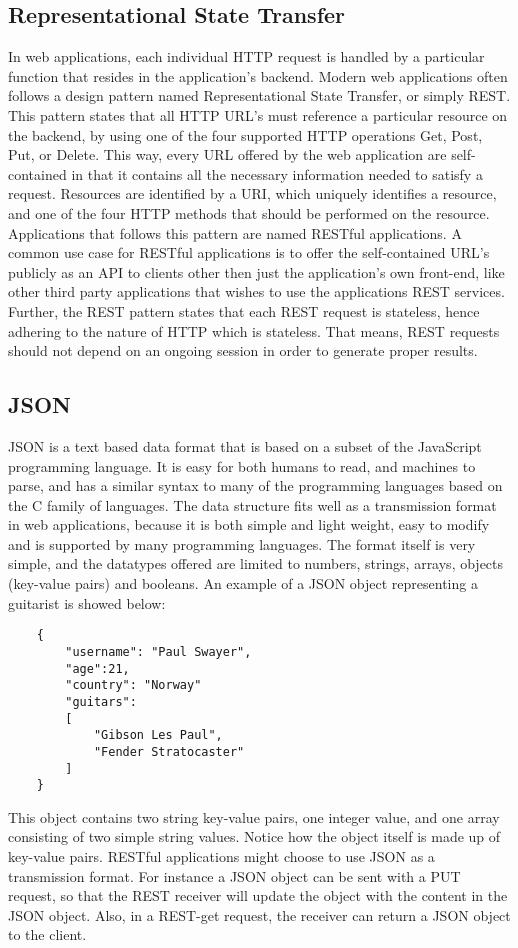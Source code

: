 \subsection{Representational State Transfer}
In web applications, each individual HTTP request is handled by a particular function that resides in the application's backend. Modern web applications often follows a design pattern named Representational State Transfer, or simply REST. \cite{armando2012} This pattern states that all HTTP URL's must reference a particular resource on the backend, by using one of the four supported HTTP operations Get, Post, Put, or Delete. This way, every URL offered by the web application are self-contained in that it contains all the necessary information needed to satisfy a request. Resources are identified by a URI, which uniquely identifies a resource, and one of the four HTTP methods that should be performed on the resource. Applications that follows this pattern are named RESTful applications. A common use case for RESTful applications is to offer the self-contained URL's publicly as an API to clients other then just the application's own front-end, like other third party applications that wishes to use the applications REST services. Further, the REST pattern states that each REST request is stateless, hence adhering to the nature of HTTP which is stateless. That means, REST requests should not depend on an ongoing session in order to generate proper results.

\subsection{JSON}
JSON\cite{json} is a text based data format that is based on a subset of the JavaScript programming language. It is easy for both humans to read, and machines to parse, and has a similar syntax to many of the programming languages based on the C family of languages. The data structure fits well as a transmission format in web applications, because it is both simple and light weight, easy to modify and is supported by many programming languages. The format itself is very simple, and the datatypes offered are limited to numbers, strings, arrays, objects (key-value pairs) and booleans. An example of a JSON object representing a guitarist is showed below:
	\begin{lstlisting}
	{
		"username": "Paul Swayer",
		"age":21,
		"country": "Norway"
		"guitars": 
		[
			"Gibson Les Paul",
			"Fender Stratocaster"
		]
	}
	\end{lstlisting}
This object contains two string key-value pairs, one integer value, and one array consisting of two simple string values. Notice how the object itself is made up of key-value pairs. RESTful applications might choose to use JSON as a transmission format. For instance a JSON object can be sent with a PUT request, so that the REST receiver will update the object with the content in the JSON object. Also, in a REST-get request, the receiver can return a JSON object to the client.

